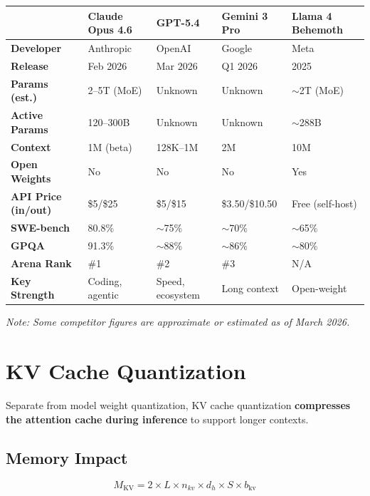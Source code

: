\documentclass[11pt,a4paper]{article}
\begin{document}
\begin{center}
\begin{tabular}{L{2.5cm}L{2.5cm}L{2.5cm}L{2.5cm}L{2.5cm}}
\toprule
& \textbf{Claude Opus 4.6} & \textbf{GPT-5.4} & \textbf{Gemini 3 Pro} & \textbf{Llama 4 Behemoth} \\
\midrule
\textbf{Developer} & Anthropic & OpenAI & Google & Meta \\
\textbf{Release} & Feb 2026 & Mar 2026 & Q1 2026 & 2025 \\
\textbf{Params (est.)} & 2--5T (MoE) & Unknown & Unknown & $\sim$2T (MoE) \\
\textbf{Active Params} & 120--300B & Unknown & Unknown & $\sim$288B \\
\textbf{Context} & 1M (beta) & 128K--1M & 2M & 10M \\
\textbf{Open Weights} & No & No & No & Yes \\
\textbf{API Price (in/out)} & \$5/\$25 & \$5/\$15 & \$3.50/\$10.50 & Free (self-host) \\
\textbf{SWE-bench} & 80.8\% & $\sim$75\% & $\sim$70\% & $\sim$65\% \\
\textbf{GPQA} & 91.3\% & $\sim$88\% & $\sim$86\% & $\sim$80\% \\
\textbf{Arena Rank} & \#1 & \#2 & \#3 & N/A \\
\textbf{Key Strength} & Coding, agentic & Speed, ecosystem & Long context & Open-weight \\
\bottomrule
\end{tabular}
\end{center}

\textit{Note: Some competitor figures are approximate or estimated as of March 2026.}

\section{KV Cache Quantization}

Separate from model weight quantization, KV cache quantization \textbf{compresses the attention cache during inference} to support longer contexts.

\subsection{Memory Impact}

$$M_{\text{KV}} = 2 \times L \times n_{kv} \times d_h \times S \times b_{\text{kv}}$$
\end{document}
